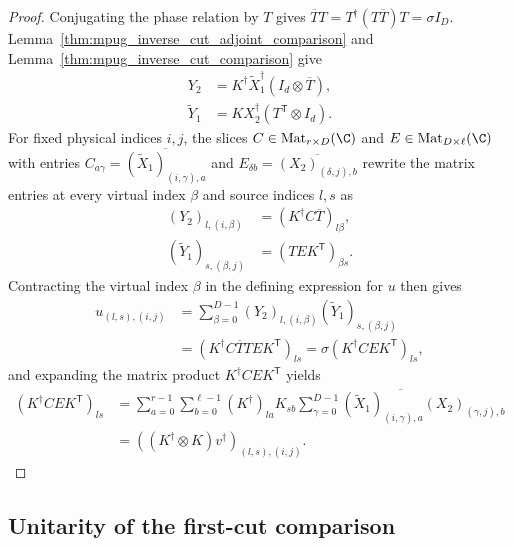 \begin{proof}\leanok
    Conjugating the phase relation by $T$ gives
    $\overline T T=T^\dagger(T\overline T)T=\sigma I_D$.
    Lemma~\ref{thm:mpug_inverse_cut_adjoint_comparison} and
    Lemma~\ref{thm:mpug_inverse_cut_comparison} give
    \begin{align}
        Y_2            & =K^\dagger\widetilde X_1^\dagger(I_d\otimes\overline T), \\
        \widetilde Y_1 & =KX_2^\dagger(T^{\mathsf T}\otimes I_d).
    \end{align}
    For fixed physical indices $i,j$, the slices
    $C\in\operatorname{Mat}_{r\times D}(\C)$ and
    $E\in\operatorname{Mat}_{D\times\ell}(\C)$ with entries
    $C_{a\gamma}=\overline{(\widetilde X_1)_{(i,\gamma),a}}$ and
    $E_{\delta b}=\overline{(X_2)_{(\delta,j),b}}$ rewrite the matrix entries
    at every virtual index $\beta$ and source indices $l,s$ as
    \begin{align}
        (Y_2)_{l,(i,\beta)}
         & =(K^\dagger C\overline T)_{l\beta}, \\
        (\widetilde Y_1)_{s,(\beta,j)}
         & =(TEK^{\mathsf T})_{\beta s}.
    \end{align}
    Contracting the virtual index $\beta$ in the defining expression for $u$
    then gives
    \begin{align}
        u_{(l,s),(i,j)}
         & =\sum_{\beta=0}^{D-1}(Y_2)_{l,(i,\beta)}
        (\widetilde Y_1)_{s,(\beta,j)}                      \\
         & =(K^\dagger C\overline T T E K^{\mathsf T})_{ls}
        =\sigma(K^\dagger C E K^{\mathsf T})_{ls},
    \end{align}
    and expanding the matrix product $K^\dagger CEK^{\mathsf T}$ yields
    \begin{align}
        (K^\dagger C E K^{\mathsf T})_{ls}
         & =\sum_{a=0}^{r-1}\sum_{b=0}^{\ell-1}
        (K^\dagger)_{la}K_{sb}
        \overline{\sum_{\gamma=0}^{D-1}
        (\widetilde X_1)_{(i,\gamma),a}(X_2)_{(\gamma,j),b}} \\
         & =((K^\dagger\otimes K)v^\dagger)_{(l,s),(i,j)}.
    \end{align}
\end{proof}
\subsection{Unitarity of the first-cut comparison}

